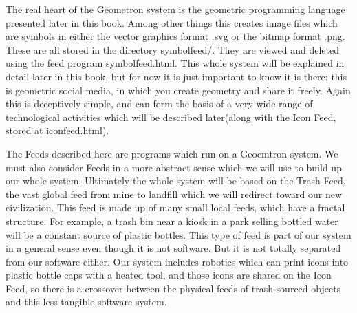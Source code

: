 The real heart of the Geometron system is the geometric programming language presented later in this book.  Among other things this creates image files which are symbols in either the vector graphics format .svg or the bitmap format .png.  These are all stored in the directory symbolfeed/.  They are viewed and deleted using the feed program symbolfeed.html. This whole system will be explained in detail later in this book, but for now it is just important to know it is there: this is geometric social media, in which you create geometry and share it freely.  Again this is deceptively simple, and can form the basis of a very wide range of technological activities which will be described later(along with the Icon Feed, stored at iconfeed.html).

The Feeds described here are programs which run on a Geoemtron system.  We must also consider Feeds in a more abstract sense which we will use to build up our whole system.  Ultimately the whole system will be based on the Trash Feed, the vast global feed from mine to landfill which we will redirect toward our new civilization. This feed is made up of many small local feeds, which have a fractal structure.  For example, a trash bin near a kiosk in a park selling bottled water will be a constant source of plastic bottles.  This type of feed is part of our system in a general sense even though it is not software.  But it is not totally separated from our software either.  Our system includes robotics which can print icons into plastic bottle caps with a heated tool, and those icons are shared on the Icon Feed, so there is a crossover between the physical feeds of trash-sourced objects and this less tangible software system.


